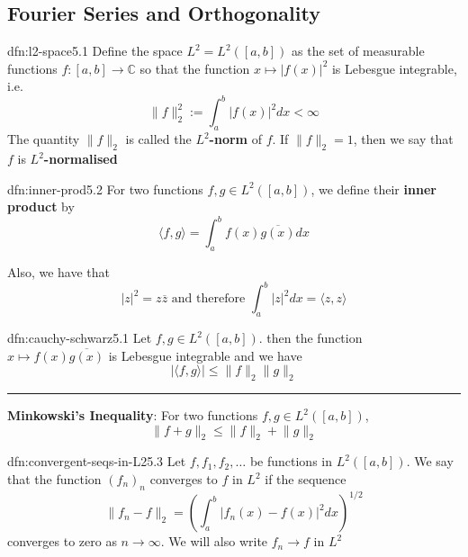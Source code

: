 \documentclass[landscape, 8pt]{extarticle}
\begin{document}
\begin{multicols}{3}
\section{Fourier Series and Orthogonality}

\begin{dfn}{dfn:l2-space}{5.1}
	Define the space $L^{2} = L^{2}([a, b])$ as the set of measurable functions $f : [a, b] \to \mathbb{C}$ so that the function $x \mapsto \lvert f(x) \rvert^{2}$ is Lebesgue integrable, i.e.
	\[\lVert f \rVert^{2}_{2} := \int_{a}^{b} \lvert f(x) \rvert^{2} dx < \infty\]
	The quantity $\lVert f \rVert_{2}$ is called the \textbf{$L^{2}$-norm} of $f$. If $\lVert f \rVert_{2} = 1$, then we say that $f$ is \textbf{$L^{2}$-normalised}
\end{dfn}

\begin{dfn}{dfn:inner-prod}{5.2}
	For two functions $f, g\in L^{2}([a,b])$, we define their \textbf{inner product} by
	\[\langle f, g \rangle = \int_{a}^{b} f(x)\overline{g(x)} dx\]

	Also, we have that
	\[\lvert z \rvert^{2} = z \overline{z} \text{ and therefore } \int_{a}^{b} \lvert z \rvert^{2} dx = \langle z, z \rangle\]
\end{dfn}

\begin{thm}{dfn:cauchy-schwarz}{5.1}
	Let $f, g\in L^{2}([a, b])$. then the function $x \mapsto f(x)\overline{g(x)}$ is Lebesgue integrable and we have
	\[\lvert \langle f, g \rangle \rvert \le \lVert f \rVert_{2} \lVert g \rVert_{2}\]

	\noindent\rule{\textwidth}{0.2pt}
	\textbf{Minkowski's Inequality}: For two functions $f, g\in L^{2}([a, b])$,
	\[\lVert f + g \rVert_{2} \le \lVert f \rVert_{2} + \lVert g \rVert_{2}\]
\end{thm}

\begin{dfn}{dfn:convergent-seqs-in-L2}{5.3}
	Let $f,f_{1},f_{2},\dots$ be functions in $L^{2}([a, b])$. We say that the function $(f_{n})_{n}$ converges to $f$ in $L^{2}$ if the sequence
	\[\lVert f_{n} - f \rVert_{2} = \left(\int_{a}^{b} \lvert f_{n}(x) - f(x) \rvert^{2} dx\right)^{1 /2}\]
	converges to zero as $n \to \infty$. We will also write $f_{n} \to f$ in $L^{2}$
\end{dfn}


\end{multicols}
\end{document}
